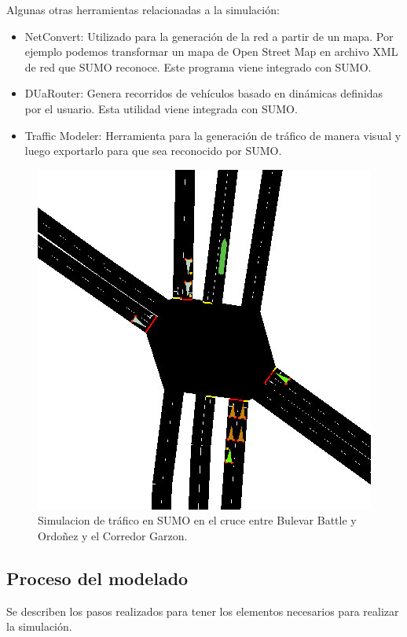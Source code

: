 Algunas otras herramientas relacionadas a la simulación:

\begin{itemize}
	
	\item  NetConvert: Utilizado para la generación de la red a partir de un mapa. Por ejemplo podemos transformar un mapa de Open Street Map en archivo XML de red que SUMO reconoce. Este programa viene integrado con SUMO.
	\item DUaRouter: Genera recorridos de vehículos basado en dinámicas definidas por el usuario. Esta utilidad viene integrada con SUMO.
	\item Traffic Modeler: Herramienta para la generación de tráfico de manera visual y luego exportarlo para que sea reconocido por SUMO. \citep{TrafficModeler}
	
	
\end{itemize}

\begin{figure}[h]
	\centering
	\includegraphics[width=0.7\linewidth]{Figures/sim1}
	\caption{Simulacion de tráfico en SUMO en el cruce entre Bulevar Battle y Ordoñez y el Corredor Garzon.}
	\label{fig:sim1}
\end{figure}



\subsection{Proceso del modelado}

Se describen los pasos realizados para tener los elementos necesarios para realizar la simulación.


